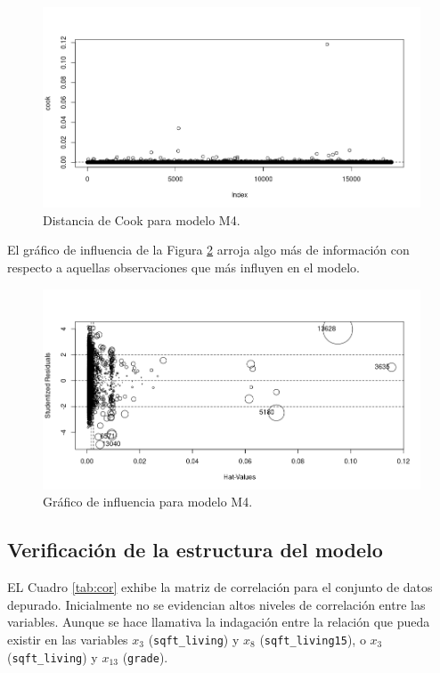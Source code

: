 \documentclass[10pt,letterpaper]{article}
\begin{document}
	\begin{figure}[!htbp]
		\includegraphics[scale=0.5]{cookm4.png}
		\caption{Distancia de Cook para modelo M4.}
		\label{fig:cookm4}
	\end{figure}
El gráfico de influencia de la Figura \ref{fig:infm4} arroja algo más de información con respecto a aquellas observaciones que más influyen en el modelo.
	\begin{figure}[!htbp]
		\includegraphics[scale=0.5]{infm4.png}
		\caption{Gráfico de influencia para modelo M4.}
		\label{fig:infm4}
	\end{figure}

\subsection{Verificación de la estructura del modelo}

EL Cuadro \ref{tab:cor} exhibe la matriz de correlación para el conjunto de datos depurado. Inicialmente no se evidencian altos niveles de correlación entre las variables. Aunque se hace llamativa la indagación entre la relación que pueda existir en las variables $x_3$ (\texttt{sqft\_living}) y $x_8$ (\texttt{sqft\_living15}), o $x_3$ (\texttt{sqft\_living}) y $x_{13}$ (\texttt{grade}).
\end{document}
